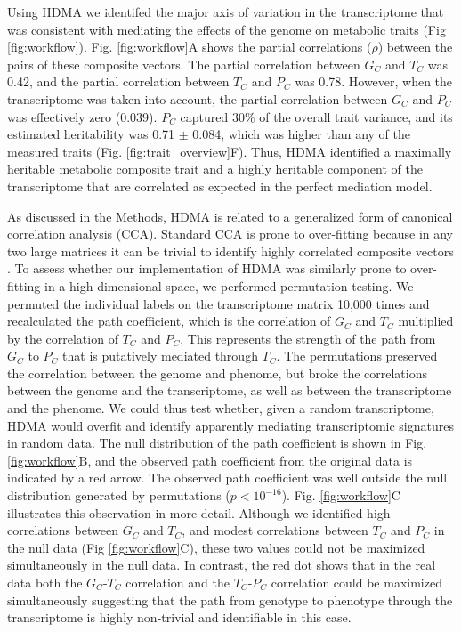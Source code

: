 \documentclass[
]{article}
\begin{document}
Using HDMA we identifed the major axis of variation in the transcriptome
that was consistent with mediating the effects of the genome on
metabolic traits (Fig \ref{fig:workflow}). Fig. \ref{fig:workflow}A
shows the partial correlations (\(\rho\)) between the pairs of these
composite vectors. The partial correlation between \(G_C\) and \(T_C\)
was 0.42, and the partial correlation between \(T_C\) and \(P_C\) was
0.78. However, when the transcriptome was taken into account, the
partial correlation between \(G_C\) and \(P_C\) was effectively zero
(0.039). \(P_C\) captured 30\% of the overall trait variance, and its
estimated heritability was 0.71 \(\pm\) 0.084, which was higher than any
of the measured traits (Fig. \ref{fig:trait_overview}F). Thus, HDMA
identified a maximally heritable metabolic composite trait and a highly
heritable component of the transcriptome that are correlated as expected
in the perfect mediation model.

As discussed in the Methods, HDMA is related to a generalized form of
canonical correlation analysis (CCA). Standard CCA is prone to
over-fitting because in any two large matrices it can be trivial to
identify highly correlated composite vectors \cite{pmid38383808}. To
assess whether our implementation of HDMA was similarly prone to
over-fitting in a high-dimensional space, we performed permutation
testing. We permuted the individual labels on the transcriptome matrix
10,000 times and recalculated the path coefficient, which is the
correlation of \(G_C\) and \(T_C\) multiplied by the correlation of
\(T_C\) and \(P_C\). This represents the strength of the path from
\(G_C\) to \(P_C\) that is putatively mediated through \(T_C\). The
permutations preserved the correlation between the genome and phenome,
but broke the correlations between the genome and the transcriptome, as
well as between the transcriptome and the phenome. We could thus test
whether, given a random transcriptome, HDMA would overfit and identify
apparently mediating transcriptomic signatures in random data. The null
distribution of the path coefficient is shown in Fig.
\ref{fig:workflow}B, and the observed path coefficient from the original
data is indicated by a red arrow. The observed path coefficient was well
outside the null distribution generated by permutations
(\(p < 10^{-16}\)). Fig. \ref{fig:workflow}C illustrates this
observation in more detail. Although we identified high correlations
between \(G_C\) and \(T_C\), and modest correlations between \(T_C\) and
\(P_C\) in the null data (Fig \ref{fig:workflow}C), these two values
could not be maximized simultaneously in the null data. In contrast, the
red dot shows that in the real data both the \(G_C\)-\(T_C\) correlation
and the \(T_C\)-\(P_C\) correlation could be maximized simultaneously
suggesting that the path from genotype to phenotype through the
transcriptome is highly non-trivial and identifiable in this case.
\end{document}
